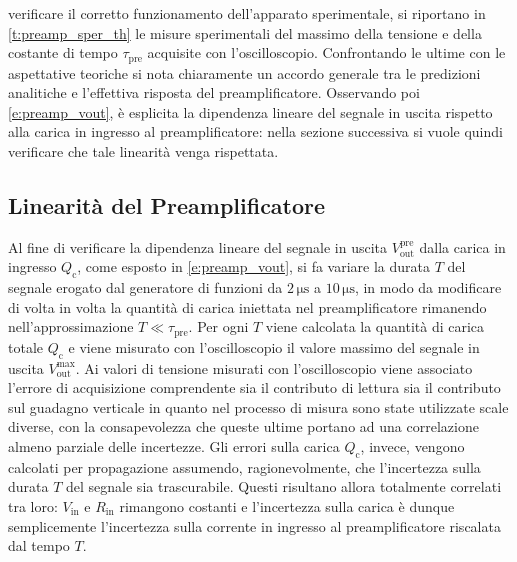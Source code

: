 \documentclass[a4paper,11pt]{article} %
\begin{document}
verificare il corretto funzionamento dell'apparato sperimentale, si riportano in \autoref{t:preamp_sper_th} le misure
sperimentali del massimo della tensione e della costante di tempo $\tau_{\text{pre}}$ acquisite con l'oscilloscopio.
Confrontando le ultime con le aspettative teoriche si nota chiaramente  un accordo generale tra le predizioni analitiche
e l'effettiva risposta del preamplificatore. Osservando poi \autoref{e:preamp_vout}, è esplicita la dipendenza lineare
del segnale in uscita rispetto alla carica in ingresso al preamplificatore: nella sezione successiva si vuole quindi
verificare che tale linearità venga rispettata. 





\subsection{Linearità del Preamplificatore}\label{s:preamp_linearity}

Al fine di verificare la dipendenza lineare del segnale in uscita $V^{\text{pre}}_{\text{out}}$ dalla carica in ingresso
$Q_{\text{c}}$, come esposto in \autoref{e:preamp_vout}, si fa variare la durata $T$ del segnale erogato dal generatore
di funzioni da $2\,\si{\us}$ a $10\,\si{\us}$, in modo da modificare di volta in volta la quantità di carica iniettata
nel preamplificatore rimanendo nell'approssimazione $T\ll\tau_{\text{pre}}$. Per ogni $T$ viene calcolata la quantità di
carica totale $Q_{\text{c}}$ e viene misurato con l'oscilloscopio il valore massimo del segnale in uscita
$V^{\text{max}}_{\text{out}}$. Ai valori di tensione misurati con l'oscilloscopio viene associato l'errore di
acquisizione comprendente sia il contributo di lettura sia il contributo sul guadagno verticale in quanto nel processo
di misura sono state utilizzate scale diverse, con la consapevolezza che queste ultime portano ad una correlazione
almeno parziale delle incertezze. Gli errori sulla carica $Q_{\text{c}}$, invece, vengono calcolati per propagazione
assumendo, ragionevolmente, che l'incertezza sulla durata $T$ del segnale sia trascurabile. Questi risultano allora
totalmente correlati tra loro: $V_{\text{in}}$ e $R_{\text{in}}$ rimangono costanti e l'incertezza sulla carica è dunque
semplicemente l'incertezza sulla corrente in ingresso al preamplificatore riscalata dal tempo $T$.
\end{document}
